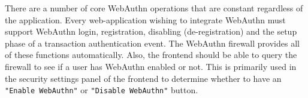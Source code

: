 There are a number of core WebAuthn operations that are constant regardless of the application. Every web-application wishing to integrate WebAuthn must support WebAuthn login, registration, disabling (de-registration) and the setup phase of a transaction authentication event. The WebAuthn firewall provides all of these functions automatically. Also, the frontend should be able to query the firewall to see if a user has WebAuthn enabled or not. This is primarily used in the security settings panel of the frontend to determine whether to  have an \lstinline{"Enable WebAuthn"} or \lstinline{"Disable WebAuthn"} button.











